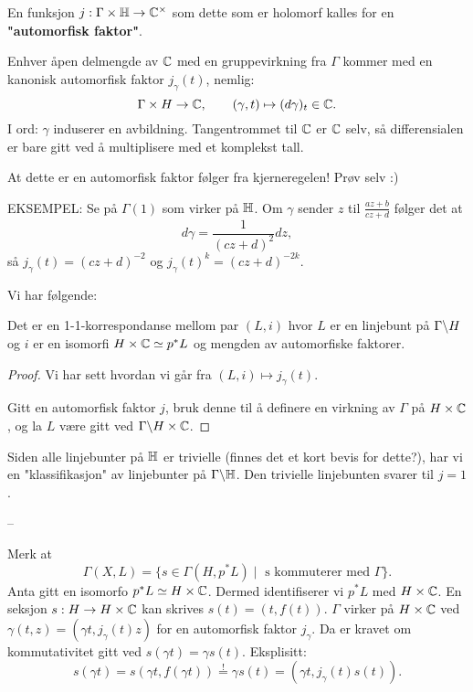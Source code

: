 \documentclass[11pt, english]{article}
\begin{document}
En funksjon $j:\Gamma \times \mathbb{H} \to \mathbb{C}^\times$ som dette som er holomorf kalles for en \textbf{"automorfisk faktor"}.

\begin{example}
Enhver åpen delmengde av $\mathbb{C}$ med en gruppevirkning fra $\Gamma$ kommer med en kanonisk automorfisk faktor $j_\gamma(t)$, nemlig:
\[
\Gamma \times H \to \mathbb{C}, \qquad (\gamma, t) \mapsto (d\gamma)_t \in \mathbb{C}.
\]
I ord: $\gamma$ induserer en avbildning. Tangentrommet til $\mathbb{C}$ er $\mathbb{C}$ selv, så differensialen er bare gitt ved å multiplisere med et komplekst tall. 

At dette er en automorfisk faktor følger fra kjerneregelen! Prøv selv :)

EKSEMPEL: Se på $\Gamma(1)$ som virker på $\mathbb{H}$. Om $\gamma$ sender $z$ til $\frac{az+b}{cz+d}$ følger det at 
$$
d\gamma = \frac{1}{(cz+d)^2} dz,
$$
så $j_\gamma(t)= (cz+d)^{-2}$ og $j_\gamma(t)^k= (cz+d)^{-2k}$. 
\end{example}

Vi har følgende:
\begin{prop}
Det er en 1-1-korrespondanse mellom par $(L,i)$ hvor $L$ er en linjebunt på $\Gamma \backslash H$ og $i$ er en isomorfi $H \times \mathbb{C} \simeq p^\ast L$ og mengden av automorfiske faktorer.
\end{prop}
\begin{proof}
Vi har sett hvordan vi går fra $(L,i) \mapsto j_\gamma(t)$. 

Gitt en automorfisk faktor $j$, bruk denne til å definere en virkning av $\Gamma$ på $H \times \mathbb{C}$, og la $L$ være gitt ved $\Gamma \backslash H \times \mathbb{C}$.
\end{proof}

Siden alle linjebunter på $\mathbb{H}$ er trivielle (finnes det et kort bevis for dette?), har vi en "klassifikasjon" av linjebunter på $\Gamma \backslash \mathbb{H}$. Den trivielle linjebunten svarer til $j=1$. 


--

Merk at
\[
\Gamma(X,L) = \{ s \in \Gamma(H, p^\ast L) \mid \text{ s kommuterer med $\Gamma$} \}.
\]
Anta gitt en isomorfo $p^\ast L \simeq H \times \mathbb{C}$. Dermed identifiserer vi $p^\ast L$ med $H \times \mathbb{C}$. En seksjon $s:H \to H \times \mathbb{C}$ kan skrives $s(t)=(t,f(t))$. $\Gamma$ virker på $H \times \mathbb{C}$ ved $\gamma(t,z) = (\gamma t, j_\gamma(t)z)$ for en automorfisk faktor $j_\gamma$. Da er kravet om kommutativitet gitt ved $s(\gamma t)=\gamma s(t)$. Eksplisitt:
\[
s(\gamma t) = s(\gamma t, f(\gamma t)) \stackrel{!}{=} \gamma s(t) = (\gamma t, j_\gamma(t) s(t)).
\]
\end{document}

